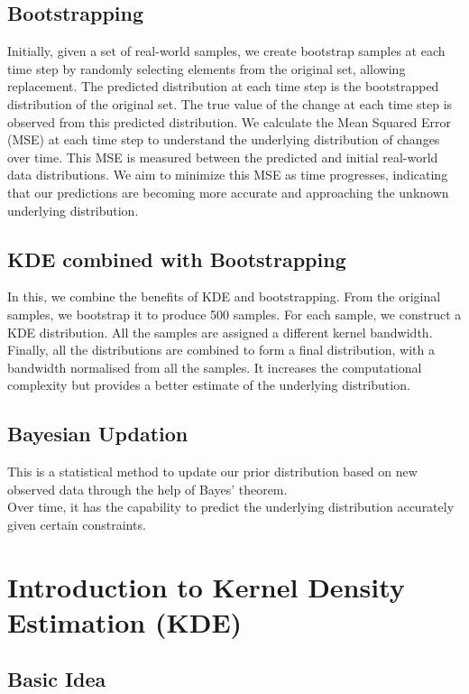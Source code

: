 \documentclass[conference]{IEEEtran}
\begin{document}
\subsection{Bootstrapping}
Initially, given a set of real-world samples, we create bootstrap samples at each time step by randomly selecting elements from the original set, allowing replacement. The predicted distribution at each time step is the bootstrapped distribution of the original set. The true value of the change at each time step is observed from this predicted distribution. We calculate the Mean Squared Error (MSE) at each time step to understand the underlying distribution of changes over time. This MSE is measured between the predicted and initial real-world data distributions. We aim to minimize this MSE as time progresses, indicating that our predictions are becoming more accurate and approaching the unknown underlying distribution.



\subsection{KDE combined with Bootstrapping}
In this, we combine the benefits of KDE and bootstrapping. From the original samples, we bootstrap it to produce 500 samples. For each sample, we construct a KDE distribution. All the samples are assigned a different kernel bandwidth. Finally, all the distributions are combined to form a final distribution, with a bandwidth normalised from all the samples. It increases the computational complexity but provides a better estimate of the underlying distribution.

\subsection{Bayesian Updation}
This is a statistical method to update our prior distribution based on new observed data through the help of Bayes' theorem.\\
Over time, it has the capability to predict the underlying distribution accurately given certain constraints.

\section{Introduction to Kernel Density Estimation (KDE)}

\subsection{Basic Idea}
\end{document}
